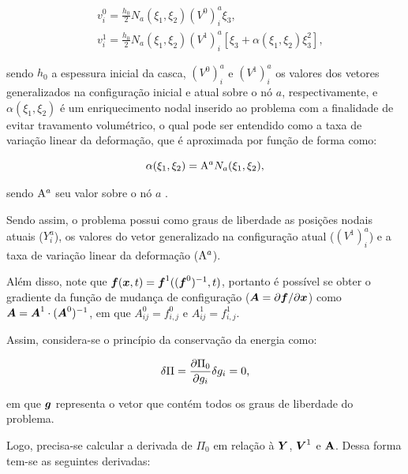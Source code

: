 \begin{subequations}
    \begin{align}
         & v_i^0=\frac{h_0}{2}N_ a(\xi_1,\xi_2)(V^0)_i^a\xi_3\text{,}                              \\
         & v_i^1=\frac{h_0}{2}N_ a(\xi_1,\xi_2)(V^1)_i^a[\xi_3+\alpha(\xi_1,\xi_2)\xi_3^2]\text{,}
    \end{align}
\end{subequations}

\noindent sendo $h_0$ a espessura inicial da casca, $(V^0)_i^a$ e $(V^1)_i^a$ os valores dos vetores generalizados na configuração inicial e atual sobre o nó $a$, respectivamente, e $\alpha(\xi_1,\xi_2)$ é um enriquecimento nodal inserido ao problema com a finalidade de evitar travamento volumétrico, o qual pode ser entendido como a taxa de variação linear da deformação, que é aproximada por função de forma como:

\begin{equation}
    \alpha(\xi_1,\xi_2)=\mathrm{A}^aN_a(\xi_1,\xi_2)\text{,}
\end{equation}

\noindent sendo $\mathrm{A}^a$ seu valor sobre o nó $a$ \cite{sanches2013unconstrained,sanches2014fluid}.

Sendo assim, o problema possui como graus de liberdade as posições nodais atuais ($Y_i^a$), os valores do vetor generalizado na configuração atual ($(V^1)_i^a$) e a taxa de variação linear da deformação ($\mathrm{A}^a$).

Além disso, note que $\boldsymbol{f}(\boldsymbol{x},t)=\boldsymbol{f}^1((\boldsymbol{f}^0)^{-1},t)$, portanto é possível se obter o gradiente da função de mudança de configuração ($\boldsymbol{A}=\partial\boldsymbol{f}/\partial\boldsymbol{x}$) como $\boldsymbol{A}=\boldsymbol{A}^1\cdot(\boldsymbol{A}^0)^{-1}$, em que $A^0_{ij}=f^0_{i,j}$ e $A^1_{ij}=f^1_{i,j}$.

Assim, considera-se o princípio da conservação da energia como:

\begin{equation}
    \delta\Pi=\frac{\partial{\Pi_0}}{\partial{g_i}}\delta g_i=0\text{,}
\end{equation}

\noindent em que $\boldsymbol{g}$ representa o vetor que contém todos os graus de liberdade do problema.

Logo, precisa-se calcular a derivada de $\Pi_0$ em relação à $\boldsymbol{Y}$, $\boldsymbol{V}^1$ e $\boldsymbol{\mathrm{A}}$. Dessa forma tem-se as seguintes derivadas:

